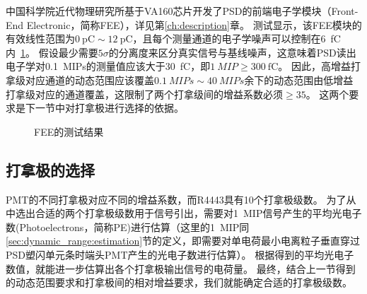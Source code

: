 中国科学院近代物理研究所基于VA160芯片开发了PSD的前端电子学模块（Front-End Electronic，简称FEE），详见第\ref{ch:description}章。
测试显示，该FEE模块的有效线性范围为$\SI{0}{\pico\coulomb}\sim\SI{12}{\pico\coulomb}$，且每个测量通道的电子学噪声可以控制在\SI{6}{\femto\coulomb}内~\ref{fig:dynamic_range:fee_test}。
假设最少需要$5\sigma$的分离度来区分真实信号与基线噪声，这意味着PSD读出电子学对\SI{0.1}{MIPs}的测量值应该大于\SI{30}{\femto\coulomb}，即$\SI{1}{MIP} \ge \SI{300}{\femto\coulomb}$。
因此，高增益打拿级对应通道的动态范围应该覆盖$\SI{0.1}{MIPs}\sim\SI{40}{MIPs}$余下的动态范围由低增益打拿级对应的通道覆盖，这限制了两个打拿级间的增益系数必须$\ge 35$。
这两个要求是下一节中对打拿极进行选择的依据。

\begin{figure}[!htb]
\centering
{}
{}
\label{fig:dynamic_range:fee_test}
\caption{FEE的测试结果}
\end{figure}

\subsection{打拿极的选择}
\label{sec:dynamic_range:dynode_selection}
PMT的不同打拿极对应不同的增益系数，而R4443具有10个打拿极级数。
为了从中选出合适的两个打拿极级数用于信号引出，需要对\SI{1}{MIP}信号产生的平均光电子数(Photoelectrons，简称PE)进行估算（这里的\SI{1}{MIP}同\ref{sec:dynamic_range:estimation}节的定义，即需要对单电荷最小电离粒子垂直穿过PSD塑闪单元条时端头PMT产生的光电子数进行估算）。
根据得到的平均光电子数值，就能进一步估算出各个打拿极输出信号的电荷量。
最终，结合上一节得到的动态范围要求和打拿极间的相对增益要求，我们就能确定合适的打拿极级数。

